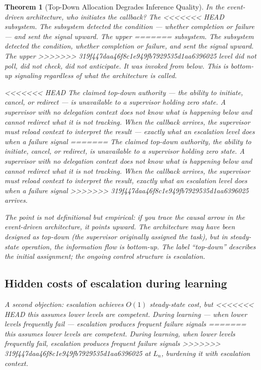 \documentclass[11pt]{article}
\newtheorem{theorem}{Theorem}
\theoremstyle{definition}
\begin{document}
\begin{theorem}[Top-Down Allocation Degrades Inference Quality]
In the event-driven architecture, who initiates the callback? The
<<<<<<< HEAD
\emph{subsystem}. The subsystem detected the condition --- whether
completion or failure --- and sent the signal \emph{upward}. The upper
=======
\emph{subsystem}. The subsystem detected the condition, whether
completion or failure, and sent the signal \emph{upward}. The upper
>>>>>>> 319f447daa46f8c1e949fb7929535d1aa6396025
level did not poll, did not check, did not anticipate. It was invoked
from below. This is bottom-up signaling regardless of what the
architecture is called.

<<<<<<< HEAD
The claimed top-down authority --- the ability to initiate, cancel, or
redirect --- is unavailable to a supervisor holding zero state. A
supervisor with no delegation context does not know what is happening
below and cannot redirect what it is not tracking. When the callback
arrives, the supervisor must \emph{reload context} to interpret the
result --- exactly what an escalation level does when a failure signal
=======
The claimed top-down authority, the ability to initiate, cancel, or
redirect, is unavailable to a supervisor holding zero state. A
supervisor with no delegation context does not know what is happening
below and cannot redirect what it is not tracking. When the callback
arrives, the supervisor must \emph{reload context} to interpret the
result, exactly what an escalation level does when a failure signal
>>>>>>> 319f447daa46f8c1e949fb7929535d1aa6396025
arrives.

The point is not definitional but empirical: if you trace the causal
arrow in the event-driven architecture, it points upward. The
architecture may have been \emph{designed} as top-down (the supervisor
originally assigned the task), but in steady-state operation, the
information flow is bottom-up. The label ``top-down'' describes the
initial assignment; the ongoing control structure is escalation.

\subsection{Hidden costs of escalation during learning}

A second objection: escalation achieves $O(1)$ steady-state cost, but
<<<<<<< HEAD
this assumes lower levels are competent. During learning --- when lower
levels frequently fail --- escalation produces frequent failure signals
=======
this assumes lower levels are competent. During learning, when lower
levels frequently fail, escalation produces frequent failure signals
>>>>>>> 319f447daa46f8c1e949fb7929535d1aa6396025
at $L_n$, burdening it with escalation context.


\end{theorem}
\end{document}
